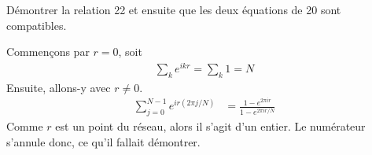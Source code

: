 \documentclass{subfiles}[../main.tex]
\begin{document}
            \begin{problem}
                Démontrer la relation 22
            et ensuite que les deux équations de 20 sont
            compatibles.
            \end{problem}
            Commençons par $r=0$, soit
            \begin{align}
                \sum_{k}e^{ikr}=\sum_k 1=N
            \end{align}
            Ensuite, allons-y avec $r\neq 0$.
            \begin{align}
                \sum_{j=0}^{N-1}e^{ir(2\pi j/N)}&=\frac{1-e^{2\pi ir}}
                {1-e^{2\pi ir/N}}
            \end{align}
            Comme $r$ est un point du réseau, alors il s'agit d'un entier. Le
            numérateur s'annule donc, ce qu'il fallait démontrer.
\end{document}
